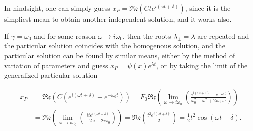 \documentclass[english,a4paper,12pt]{report}
\begin{document}
In hindsight, one can simply guess \(x_{P} = \mathfrak{Re} (Cte^{i(\omega t+\delta )} )  \), since it is the simpliest mean to obtain another independent solution, and it works also. 

If \(\gamma = \omega _{0} \) and for some reason \(\omega \to i\omega _{0}\), then the roots \(\lambda _{\pm } = \lambda  \) are repeated and the particular solution coincides with the homogenous solution, and the particular solution can be found by similar means, either by the method of variation of parameters and guess \(x_{P} = \psi (x)e^{\lambda t}  \), or by taking the limit of the generalized particular solution

\begin{equation}
    \begin{aligned} 
    x_{P} &= \mathfrak{Re} (C(e^{i(\omega t+\delta )} - e^{-\omega _{0}t } )) = F_0 \mathfrak{Re} \left( \lim_{\omega  \to i\omega _{0} } \left( \frac{e^{i(\omega t+\delta )}-e^{-\omega _{0}t }  }{\omega _{0}^2-\omega ^2+2i\omega _{0}\omega  }  \right) \right) \\ &= \mathfrak{Re} \left( \lim_{\omega  \to i\omega _{0} } \left( \frac{ite^{i(\omega t+\delta )} }{-2\omega + 2i\omega _{0} }  \right) \right) = \mathfrak{Re} \left( \frac{t^2 e^{i(\omega t+\delta )} }{2}  \right) = \frac{1}{2}t^2\cos (\omega t+\delta ). 
    \end{aligned} 
\end{equation}
\end{document}
